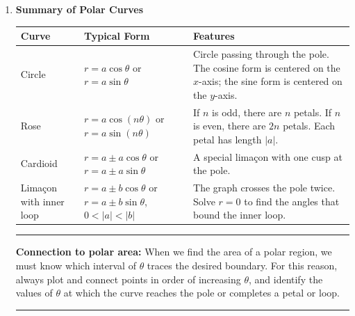 \documentclass[11pt,letterpaper]{article}
\newenvironment{notebox}{%
  \begin{center}%
  \begin{minipage}{0.94\textwidth}%
  \hrule\smallskip
}{%
  \smallskip\hrule
  \end{minipage}%
  \end{center}%
}
\begin{document}
\begin{enumerate}
\item \textbf{Summary of Polar Curves}

\begin{center}
\renewcommand{\arraystretch}{1.45}
\begin{tabular}{|>{\raggedright\arraybackslash}p{1.15in}|>{\centering\arraybackslash}p{2.75in}|>{\raggedright\arraybackslash}p{2.75in}|}
\hline
\textbf{Curve} & \textbf{Typical Form} & \textbf{Features} \\ \hline
Circle & $r=a\cos\theta$ or $r=a\sin\theta$ & Circle passing through the pole. The cosine form is centered on the $x$-axis; the sine form is centered on the $y$-axis. \\ \hline
Rose & $r=a\cos(n\theta)$ or $r=a\sin(n\theta)$ & If $n$ is odd, there are $n$ petals. If $n$ is even, there are $2n$ petals. Each petal has length $|a|$. \\ \hline
Cardioid & $r=a\pm a\cos\theta$ or $r=a\pm a\sin\theta$ & A special lima\c{c}on with one cusp at the pole. \\ \hline
Lima\c{c}on with inner loop & $r=a\pm b\cos\theta$ or $r=a\pm b\sin\theta$, $0<|a|<|b|$ & The graph crosses the pole twice. Solve $r=0$ to find the angles that bound the inner loop. \\ \hline
\end{tabular}
\end{center}

\begin{notebox}
\textbf{Connection to polar area:} When we find the area of a polar region, we must know which interval of $\theta$ traces the desired boundary. For this reason, always plot and connect points in order of increasing $\theta$, and identify the values of $\theta$ at which the curve reaches the pole or completes a petal or loop.
\end{notebox}

\end{enumerate}
\end{document}
